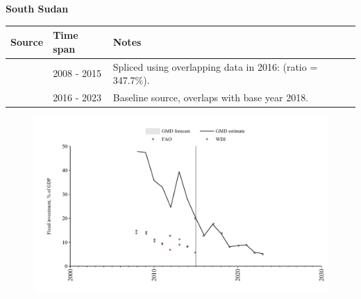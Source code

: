 \documentclass[12pt,a4paper,landscape]{article}
\begin{document}
\begin{adjustbox}{max totalsize={\paperwidth}{\paperheight},center}
\begin{minipage}[t][\textheight][t]{\textwidth}
\vspace*{0.5cm}
{}
\begin{center}
{\Large\bfseries South Sudan}
\end{center}
\vspace{0.5cm}
\begin{table}[H]
\centering
\small
\begin{tabular}{|l|l|l|}
\hline
\textbf{Source} & \textbf{Time span} & \textbf{Notes} \\
\hline
\rowcolor{white}\cite{WDI}& 2008 - 2015 &Spliced using overlapping data in 2016: (ratio = 347.7\%).\\
\rowcolor{lightgray}\cite{FAO}& 2016 - 2023 &Baseline source, overlaps with base year 2018.\\
\hline
\end{tabular}
\end{table}
\begin{figure}[H]
\centering
\includegraphics[width=\textwidth,height=0.6\textheight,keepaspectratio]{graphs/SSD_finv_GDP.pdf}
\end{figure}
\end{minipage}
\end{adjustbox}
\end{document}
